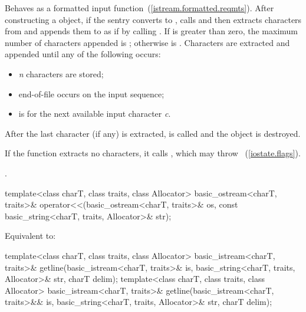 \begin{itemdescr}
\pnum
\effects
Behaves as a formatted input function~(\ref{istream.formatted.reqmts}).
After constructing a
object, if the sentry converts to , calls
and then extracts characters from  and appends them
to  as if by calling
.
If
is greater than zero, the maximum
number  of characters appended is
;
otherwise  is
.
Characters are extracted and appended until any of the following
occurs:

\begin{itemize}
\item
\textit{n}
characters are stored;
\item
end-of-file occurs on the input sequence;
\item
{}
is  for the next available input character
\textit{c}.
\end{itemize}

\pnum
After the last character (if any) is extracted,
is called and the
object  is destroyed.

\pnum
If the function extracts no characters, it calls
,
which may throw
~(\ref{iostate.flags}).

\pnum
\returns
{}.
\end{itemdescr}

%
\begin{itemdecl}
template<class charT, class traits, class Allocator>
  basic_ostream<charT, traits>&
    operator<<(basic_ostream<charT, traits>& os,
               const basic_string<charT, traits, Allocator>& str);
\end{itemdecl}

\begin{itemdescr}
\pnum
\effects
Equivalent to: 
\end{itemdescr}

%
\begin{itemdecl}
template<class charT, class traits, class Allocator>
  basic_istream<charT, traits>&
    getline(basic_istream<charT, traits>& is,
            basic_string<charT, traits, Allocator>& str,
            charT delim);
template<class charT, class traits, class Allocator>
  basic_istream<charT, traits>&
    getline(basic_istream<charT, traits>&& is,
            basic_string<charT, traits, Allocator>& str,
            charT delim);
\end{itemdecl}

